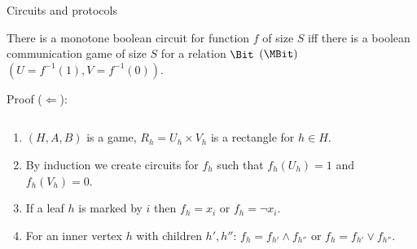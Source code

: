 \begin{frame}{Circuits and protocols}

    \begin{theorem}[S 2016] 
        There is a {\color{blue}monotone} boolean circuit for function $f$ of size $S$ iff there is a
        boolean communication game of size $S$ for a relation $\Bit$ {\color{blue}$(\MBit)$} $(U =
        f^{-1}(1), V = f^{-1}(0))$.
    \end{theorem}
    
    \pause
    Proof ($\Leftarrow$):
    \begin{columns}[t]
		\begin{column}{0.65\textwidth}
            \vspace{-5mm}
            \begin{enumerate}
                \item<3-> $(H, A, B)$ is a game, $R_h = U_h \times V_h$ is a rectangle for $h \in H$.
                \item<4-> By induction we create circuits for $f_h$ such that $f_h(U_h) = 1$ and
                    $f_h(V_h) = 0$.
                \item<5-> If a leaf $h$ is marked by $i$ then $f_h = x_i$ or $f_h = \neg x_i$.
                \item<6-> For an inner vertex $h$ with children $h', h''$: $f_h = f_{h'} \land f_{h''}$
                    or $f_h = f_{h'} \lor f_{h''}$.
            \end{enumerate}
        \end{column}
        
		\begin{column}{0.35\textwidth}
		\end{column}
	\end{columns}
\end{frame}


